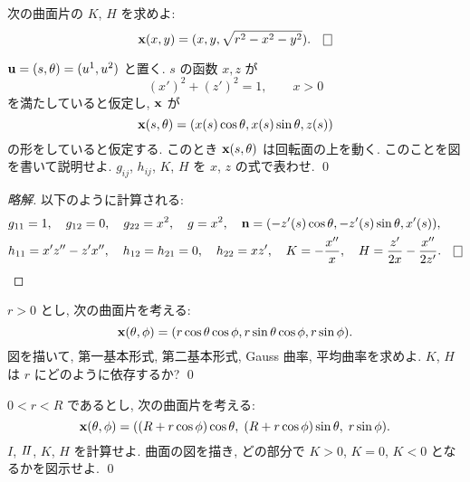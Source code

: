 \documentclass[12pt,twoside]{jarticle}
\newcommand\commentout[1]{#1}
\newcommand\commentout[1]{}
\begin{document}
\begin{question}[半球面]
 次の曲面片の $K$, $H$ を求めよ:
 \begin{equation*}
  \x(x,y) = (x,y,\sqrt{r^2-x^2-y^2}).
  \qed
 \end{equation*}
\end{question}

\begin{question}[回転面]
 ${\mathbf u}=(s,\theta)=(u^1, u^2)$ と置く. 
 $s$ の函数 $x,z$ が
 \begin{equation*}
  (x')^2 + (z')^2 = 1, \qquad x > 0
 \end{equation*}
 を満たしていると仮定し, ${\mathbf x}$ が
 \begin{equation*}
  {\mathbf x}(s,\theta)
  = (x(s)\cos\theta, x(s)\sin\theta, z(s))
 \end{equation*}
 の形をしていると仮定する. 
 このとき ${\mathbf x}(s,\theta)$ は回転面の上を動く. 
 このことを図を書いて説明せよ. 
 $g_{ij}$, $h_{ij}$, $K$, $H$ を $x$, $z$ の式で表わせ.  \qed
\end{question}

\commentout{
\begin{proof}[略解]
 以下のように計算される:
 \begin{align*}
  &
  g_{11} = 1, \quad
  g_{12} = 0, \quad
  g_{22} = x^2, \quad
  g = x^2, \quad
  \n = (-z'(s)\cos\theta, -z'(s)\sin\theta, x'(s)),
  \\ &
  h_{11} = x'z'' - z'x'', \quad
  h_{12} = h_{21} = 0, \quad
  h_{22} = x z', \quad
  K = -\frac{x''}{x}, \quad
  H = \frac{z'}{2x} - \frac{x''}{2z'}.
  \qed
 \end{align*}
\end{proof}
}

\begin{question}[球面]
 $r>0$ とし, 次の曲面片を考える:
 \begin{equation*}
  {\mathbf x}(\theta,\phi) 
  = (r\cos\theta\cos\phi, r\sin\theta\cos\phi, r\sin\phi).
 \end{equation*}
 図を描いて, 第一基本形式, 第二基本形式, Gauss 曲率, 平均曲率を求めよ. 
 $K$, $H$ は $r$ にどのように依存するか?
 \qed
\end{question}

\begin{question}[トーラス]
  $0 < r < R$ であるとし, 次の曲面片を考える:
 \begin{equation*}
    {\mathbf x}(\theta,\phi)
    =(
    (R + r \cos\phi)\cos\theta,\;
    (R + r \cos\phi)\sin\theta,\;
         r \sin\phi          ).
 \end{equation*}
 $I$, $I\!I$, $K$, $H$ を計算せよ.
 曲面の図を描き, どの部分で $K>0$, $K=0$, $K<0$ となるかを図示せよ. \qed
\end{question}
\end{document}
